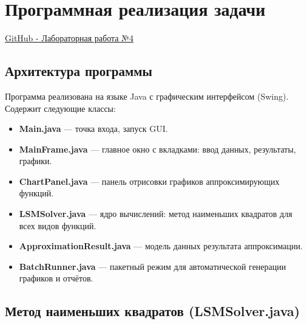 \section{Программная реализация задачи}

\href{https://github.com/utpwtb/ITMO/tree/main/4%20%D0%92%D1%8B%D1%87%D0%B8%D1%81%D0%BB%D0%B8%D1%82%D0%B5%D0%BB%D1%8C%D0%BD%D0%B0%D1%8F%20%D0%9C%D0%B0%D1%82%D0%B5%D0%BC%D0%B0%D1%82%D0%B8%D0%BA%D0%B0/%D0%9F%D1%80%D0%BE%D0%B3%D1%80%D0%B0%D0%BC%D0%BC%D0%B0/Lab4/CM_Lab4}{{\color{blue} GitHub - Лабораторная работа №4}}

\subsection{Архитектура программы}

Программа реализована на языке Java с графическим интерфейсом (Swing). Содержит следующие классы:

\begin{itemize}
\item \textbf{Main.java} — точка входа, запуск GUI.
\item \textbf{MainFrame.java} — главное окно с вкладками: ввод данных, результаты, графики.
\item \textbf{ChartPanel.java} — панель отрисовки графиков аппроксимирующих функций.
\item \textbf{LSMSolver.java} — ядро вычислений: метод наименьших квадратов для всех видов функций.
\item \textbf{ApproximationResult.java} — модель данных результата аппроксимации.
\item \textbf{BatchRunner.java} — пакетный режим для автоматической генерации графиков и отчётов.
\end{itemize}

\subsection{Метод наименьших квадратов (LSMSolver.java)}

